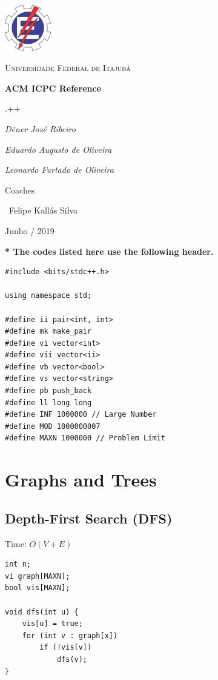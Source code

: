 \documentclass[oneside]{article}
\begin{document}
\begin{titlepage}
  \centering
  \includegraphics[width=0.15\textwidth]{logo.png}\par\vspace{1cm}
  {\scshape\LARGE Universidade Federal de Itajubá \par}
  \vspace{1.5cm}
  {\huge\bfseries ACM ICPC Reference\par}
  \vspace{2cm}
  {\scshape\Large .++\par}  
  \vspace{1cm}
  {\Large\itshape Dêner José Ribeiro\par}
  {\Large\itshape Eduardo Augusto de Oliveira\par}
  {\Large\itshape Leonardo Furtado de Oliveira\par}
  \vfill
  Coaches\par
  ~Felipe Kallás Silva
  
  \vfill
  
  {\large Junho / 2019\par}
\end{titlepage}

\thispagestyle{empty}
\tableofcontents
\pagebreak

\textbf{* The codes listed here use the following header.}
\begin{lstlisting}
#include <bits/stdc++.h>

using namespace std;

#define ii pair<int, int>
#define mk make_pair
#define vi vector<int>
#define vii vector<ii>
#define vb vector<bool>
#define vs vector<string>
#define pb push_back
#define ll long long
#define INF 1000000 // Large Number
#define MOD 1000000007
#define MAXN 1000000 // Problem Limit
\end{lstlisting}

\section{Graphs and Trees}

\subsection{Depth-First Search (DFS)}
Time: $O(V + E)$
\begin{lstlisting}
int n;
vi graph[MAXN];
bool vis[MAXN];

void dfs(int u) {
    vis[u] = true;
    for (int v : graph[x])
    	if (!vis[v])
    		dfs(v);
}
\end{lstlisting}
\end{document}
